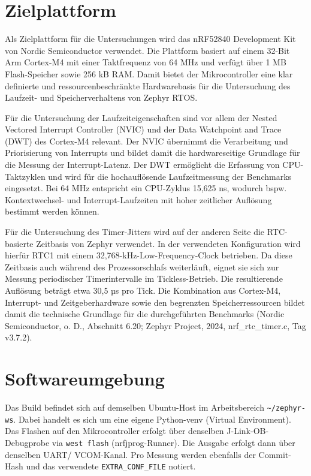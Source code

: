 \section{Zielplattform}
Als Zielplattform für die Untersuchungen wird das nRF52840 Development Kit von Nordic Semiconductor verwendet. Die Plattform basiert auf einem 32-Bit Arm Cortex-M4 mit einer Taktfrequenz von 64 MHz und verfügt über 1 MB Flash-Speicher sowie 256 kB RAM. Damit bietet der Mikrocontroller eine klar definierte und ressourcenbeschränkte Hardwarebasis für die Untersuchung des Laufzeit- und Speicherverhaltens von Zephyr RTOS.

Für die Untersuchung der Laufzeiteigenschaften sind vor allem der Nested Vectored Interrupt Controller (NVIC) und der Data Watchpoint and Trace (DWT) des Cortex-M4 relevant. Der NVIC übernimmt die Verarbeitung und Priorisierung von Interrupts und bildet damit die hardwareseitige Grundlage für die Messung der Interrupt-Latenz. Der DWT ermöglicht die Erfassung von CPU-Taktzyklen und wird für die hochauflösende Laufzeitmessung der Benchmarks eingesetzt. Bei 64 MHz entspricht ein CPU-Zyklus 15,625 ns, wodurch bspw. Kontextwechsel- und Interrupt-Laufzeiten mit hoher zeitlicher Auflösung bestimmt werden können.

Für die Untersuchung des Timer-Jitters wird auf der anderen Seite die RTC-basierte Zeitbasis von Zephyr verwendet. In der verwendeten Konfiguration wird hierfür RTC1 mit einem 32,768-kHz-Low-Frequency-Clock betrieben. Da diese Zeitbasis auch während des Prozessorschlafs weiterläuft, eignet sie sich zur Messung periodischer Timerintervalle im Tickless-Betrieb. Die resultierende Auflösung beträgt etwa 30,5 µs pro Tick. Die Kombination aus Cortex-M4, Interrupt- und Zeitgeberhardware sowie den begrenzten Speicherressourcen bildet damit die technische Grundlage für die durchgeführten Benchmarks (Nordic Semiconductor, o. D., Abschnitt 6.20; Zephyr Project, 2024, nrf\_rtc\_timer.c, Tag v3.7.2).

\section{Softwareumgebung}
Das Build befindet sich auf demselben Ubuntu-Host im Arbeitsbereich \lstinline[style=fileinline]|~/zephyr-ws|. Dabei handelt es sich um eine eigene Python-venv (Virtual Environment). Das Flashen auf den Mikrocontroller erfolgt über denselben J-Link-OB-Debugprobe via \lstinline[style=fileinline]|west flash| (nrfjprog-Runner). Die Ausgabe erfolgt dann über denselben UART/ VCOM-Kanal. Pro Messung werden ebenfalls der Commit-Hash und das verwendete \lstinline[style=fileinline]|EXTRA_CONF_FILE| notiert.

